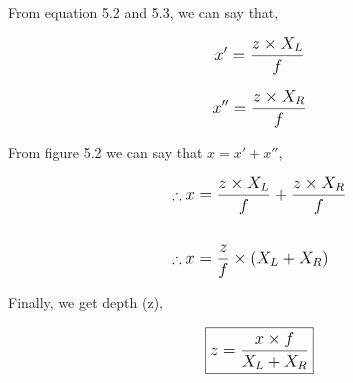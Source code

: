 \documentclass[../../hardware_design_intro/hardware_design_intro.tex]{subfiles}
\begin{document}
From equation 5.2 and 5.3, we can say that,

\begin{equation}
    \text{\large$ x' = \frac{z \times X_{L}}{f} $}
\end{equation}

\begin{equation}
    \text{\large$ x'' = \frac{z \times X_{R}}{f} $}
\end{equation}

From figure 5.2 we can say that \(x = x' + x'' \),

\begin{align*}
    \therefore{}&\text{\large$ x = \frac{z \times X_{L}}{f} + \frac{z \times X_{R}}{f} $}\\\\
    \therefore{}&\text{\large$ x = \frac{z}{f} \times (X_{L} + X_{R}) $}
\end{align*}

Finally, we get depth (z),

\begin{equation}
    \boxed{\text{\large$ z = \frac{x \times f}{X_{L} + X_{R}} $}}
\end{equation}
\end{document}

